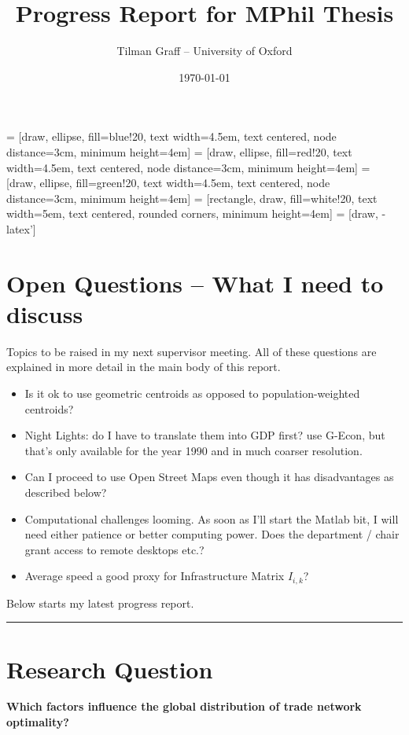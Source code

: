 \documentclass[11pt, oneside]{article}   	%
\title{Progress Report for MPhil Thesis}
\author{Tilman Graff -- University of Oxford}
\date{\today}
\begin{document}
 = [draw, ellipse, fill=blue!20,
    text width=4.5em, text centered, node distance=3cm, minimum height=4em]
 = [draw, ellipse, fill=red!20,
    text width=4.5em, text centered, node distance=3cm, minimum height=4em]
 = [draw, ellipse, fill=green!20,
    text width=4.5em, text centered, node distance=3cm, minimum height=4em]
 = [rectangle, draw, fill=white!20,
    text width=5em, text centered, rounded corners, minimum height=4em]
 = [draw, -latex']


\maketitle

\section*{Open Questions -- What I need to discuss}
Topics to be raised in my next supervisor meeting. All of these questions are explained in more detail in the main body of this report.

\begin{itemize}
\item Is it ok to use geometric centroids as opposed to population-weighted centroids?
\item Night Lights: do I have to translate them into GDP first? \cite{fajgelbaum_optimal_2017} use G-Econ, but that's only available for the year 1990 and in much coarser resolution.
\item Can I proceed to use Open Street Maps even though it has disadvantages as described below?
\item Computational challenges looming. As soon as I'll start the Matlab bit, I will need either patience or better computing power. Does the department / chair grant access to remote desktops etc.?
\item Average speed a good proxy for Infrastructure Matrix $I_{i,k}$?

\end{itemize}

Below starts my latest progress report.

\noindent\rule{\textwidth}{0.4pt}

\section{Research Question}
\textbf{Which factors influence the global distribution of trade network optimality?}
\end{document}
